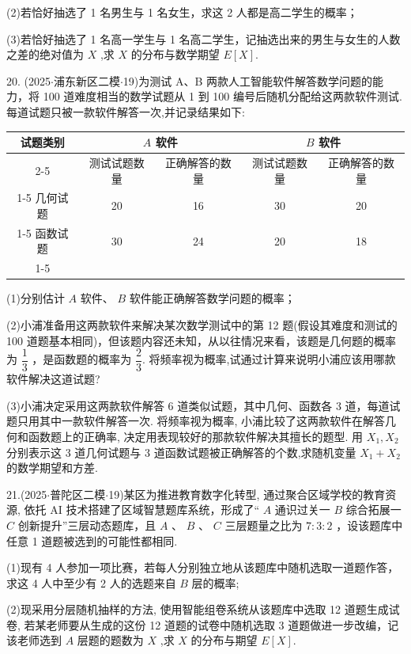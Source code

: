 (2)若恰好抽选了 1 名男生与 1 名女生，求这 2 人都是高二学生的概率；

(3)若恰好抽选了 1 名高一学生与 1 名高二学生，记抽选出来的男生与女生的人数之差的绝对值为 $X$ ,求 $X$ 的分布与数学期望 $E\left\lbrack  X\right\rbrack$.

20. (2025$\cdot$浦东新区二模$\cdot$19)为测试 A、B 两款人工智能软件解答数学问题的能力，将 100 道难度相当的数学试题从 1 到 100 编号后随机分配给这两款软件测试. 每道试题只被一款软件解答一次,并记录结果如下:

\begin{center}

\begin{tabular}{|c|c|c|c|c|}
\hline
\multirow{2}{*}{试题类别} & \multicolumn{2}{|c|}{$A$ 软件} & \multicolumn{2}{|c|}{$B$ 软件} \\
\cline{2-5}
 & 测试试题数量 & 正确解答的数量 & 测试试题数量 & 正确解答的数量 \\
\cline{1-5}
几何试题 & 20 & 16 & 30 & 20 \\
\cline{1-5}
函数试题 & 30 & 24 & 20 & 18 \\
\cline{1-5}
\hline
\end{tabular}
\end{center}

(1)分别估计 $A$ 软件、 $B$ 软件能正确解答数学问题的概率；

(2)小浦准备用这两款软件来解决某次数学测试中的第 12 题(假设其难度和测试的 100 道题基本相同)，但该题内容还未知，从以往情况来看，该题是几何题的概率为 $\dfrac{1}{3}$ ，是函数题的概率为 $\dfrac{2}{3}$. 将频率视为概率,试通过计算来说明小浦应该用哪款软件解决这道试题?

(3)小浦决定采用这两款软件解答 6 道类似试题，其中几何、函数各 3 道，每道试题只用其中一款软件解答一次. 将频率视为概率, 小浦比较了这两款软件在解答几何和函数题上的正确率, 决定用表现较好的那款软件解决其擅长的题型. 用 ${X}_{1},{X}_{2}$ 分别表示这 3 道几何试题与 3 道函数试题被正确解答的个数,求随机变量 ${X}_{1} + {X}_{2}$ 的数学期望和方差.

21.(2025$\cdot$普陀区二模$\cdot$19)某区为推进教育数字化转型, 通过聚合区域学校的教育资源, 依托 AI 技术搭建了区域智慧题库系统，形成了“ $A$ 通识过关一 $B$ 综合拓展一 $C$ 创新提升”三层动态题库，且 $A$ 、 $B$ 、 $C$ 三层题量之比为 $7 : 3 : 2$ ，设该题库中任意 1 道题被选到的可能性都相同.

(1)现有 4 人参加一项比赛，若每人分别独立地从该题库中随机选取一道题作答，求这 4 人中至少有 2 人的选题来自 $B$ 层的概率;

(2)现采用分层随机抽样的方法, 使用智能组卷系统从该题库中选取 12 道题生成试卷, 若某老师要从生成的这份 12 道题的试卷中随机选取 3 道题做进一步改编，记该老师选到 $A$ 层题的题数为 $X$ ,求 $X$ 的分布与期望 $E\left\lbrack  X\right\rbrack$.

